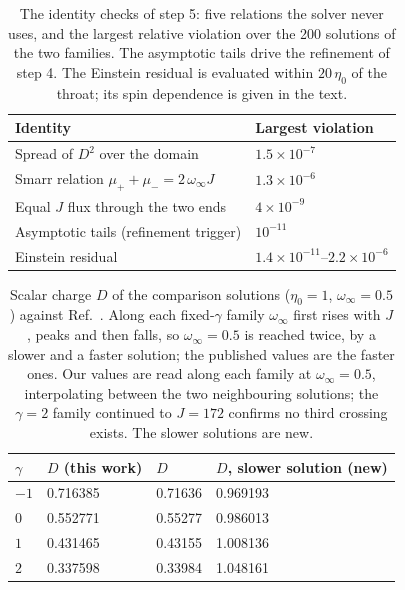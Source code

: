 \documentclass[twocolumn,floatfix,aps,prd,superscriptaddress,nofootinbib]{revtex4-2}
\begin{document}
\begin{table}[t]
\caption{The identity checks of step 5: five relations the solver never uses, and the largest relative violation over the 200 solutions of the two families. The asymptotic tails drive the refinement of step 4. The Einstein residual is evaluated within $20\,\eta_0$ of the throat; its spin dependence is given in the text.}
\label{tab:gates}
\scriptsize
\begin{ruledtabular}
\begin{tabular}{ll}
Identity & Largest violation \\
\hline
Spread of $D^2$ over the domain & $1.5\times10^{-7}$ \\
Smarr relation $\mu_++\mu_-=2\,\omega_\infty J$ & $1.3\times10^{-6}$ \\
Equal $J$ flux through the two ends & $4\times10^{-9}$ \\
Asymptotic tails (refinement trigger) & $10^{-11}$ \\
Einstein residual & $1.4{\times}10^{-11}$--$2.2{\times}10^{-6}$ \\
\end{tabular}
\end{ruledtabular}
\end{table}

\begin{table}[t]
\caption{Scalar charge $D$ of the comparison solutions ($\eta_0=1$, $\omega_\infty=0.5$) against Ref.~\cite{chew2016}. Along each fixed-$\gamma$ family $\omega_\infty$ first rises with $J$, peaks and then falls, so $\omega_\infty=0.5$ is reached twice, by a slower and a faster solution; the published values are the faster ones. Our values are read along each family at $\omega_\infty=0.5$, interpolating between the two neighbouring solutions; the $\gamma=2$ family continued to $J=172$ confirms no third crossing exists. The slower solutions are new.}
\label{tab:anchors}
\scriptsize
\begin{ruledtabular}
\begin{tabular}{llll}
$\gamma$ & $D$ (this work) & $D$~\cite{chew2016} & $D$, slower solution (new) \\
\hline
$-1$ & 0.716385 & 0.71636 & 0.969193 \\
$0$  & 0.552771 & 0.55277 & 0.986013 \\
$1$  & 0.431465 & 0.43155 & 1.008136 \\
$2$  & 0.337598 & 0.33984 & 1.048161 \\
\end{tabular}
\end{ruledtabular}
\end{table}
\end{document}
